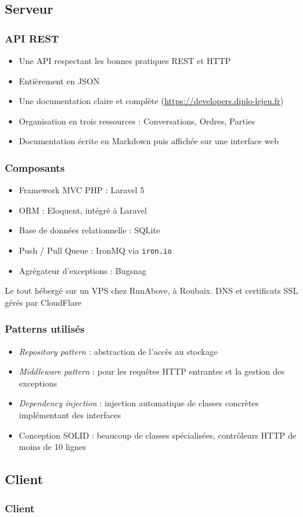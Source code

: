 \subsection{Serveur}
	\begin{frame}
		\frametitle{API REST}
		\begin{itemize}
			\item Une API respectant les bonnes pratiques REST et HTTP
			\item Entièrement en JSON
			\item Une documentation claire et complète (\url{https://developers.diplo-lejeu.fr})
			\item Organisation en trois ressources : Conversations, Ordres, Parties
			\item Documentation écrite en Markdown puis affichée sur une interface web
		\end{itemize}
	\end{frame}

	\begin{frame}
		\frametitle{Composants}
		\begin{itemize}
			\item Framework MVC PHP : Laravel 5
			\item ORM : Eloquent, intégré à Laravel
			\item Base de données relationnelle : SQLite
			\item Push / Pull Queue : IronMQ via \texttt{iron.io}
			\item Agrégateur d'exceptions : Bugsnag
		\end{itemize}\bigskip
		Le tout hébergé sur un VPS chez RunAbove, à Roubaix. DNS et certificats SSL gérés par CloudFlare
	\end{frame}

	\begin{frame}
		\frametitle{Patterns utilisés}
		\begin{itemize}
			\item \textit{Repository pattern} : abstraction de l'accès au stockage
			\item \textit{Middleware pattern} : pour les requêtes HTTP entrantes et la gestion des exceptions
			\item \textit{Dependency injection} : injection automatique de classes concrètes implémentant des interfaces
			\item Conception SOLID : beaucoup de classes spécialisées, contrôleurs HTTP de moins de 10 lignes
		\end{itemize}
	\end{frame}

\subsection{Client}
	\begin{frame}
		\frametitle{Client}
	\end{frame}
